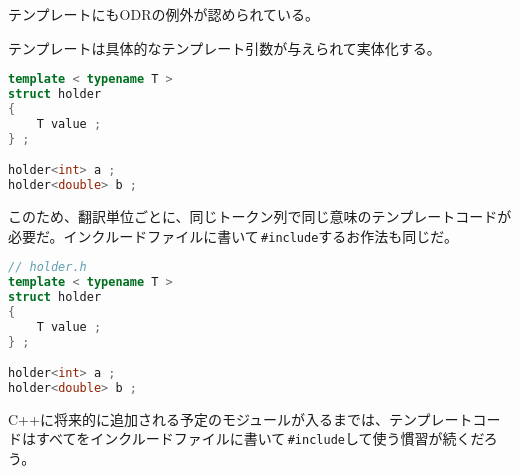 
テンプレートにもODRの例外が認められている。

テンプレートは具体的なテンプレート引数が与えられて実体化する。

\begin{lstlisting}[language={C++}]
template < typename T >
struct holder
{
    T value ;
} ;

holder<int> a ;
holder<double> b ;
\end{lstlisting}

このため、翻訳単位ごとに、同じトークン列で同じ意味のテンプレートコードが必要だ。インクルードファイルに書いて\,\texttt{\#include}するお作法も同じだ。

\begin{lstlisting}[language={C++}]
// holder.h
template < typename T >
struct holder
{
    T value ;
} ;

holder<int> a ;
holder<double> b ;
\end{lstlisting}

C++に将来的に追加される予定のモジュールが入るまでは、テンプレートコードはすべてをインクルードファイルに書いて\,\texttt{\#include}して使う慣習が続くだろう。
